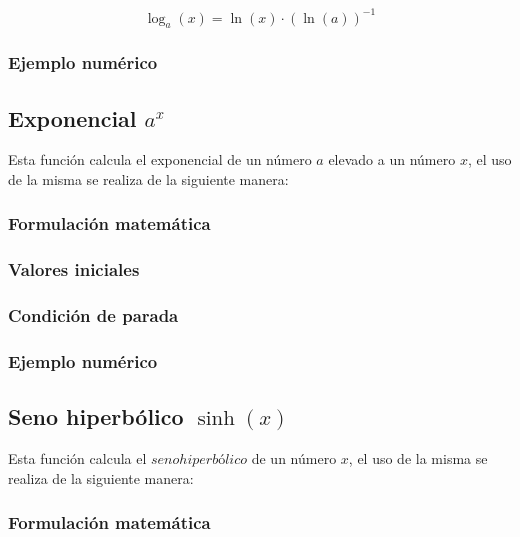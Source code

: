 \documentclass[10pt,a4paper]{article}
\begin{document}
	\begin{equation}\label{key13}
		\log_{a}(x) = \ln(x)\cdot (\ln(a))^{-1}
	\end{equation}
	
	\subsubsection{Ejemplo numérico}
	
	\subsection{Exponencial $a^{x}$}
	
	Esta función calcula el exponencial de un número $a$ elevado a un número $x$, el uso de la misma se realiza de la siguiente manera:
	
	\begin{center}
	\end{center}
	
	\subsubsection{Formulación matemática}
	
	\subsubsection{Valores iniciales}
	
	\subsubsection{Condición de parada}
	
	\subsubsection{Ejemplo numérico}
	
	\subsection{Seno hiperbólico $\sinh(x)$}
	
	Esta función calcula el $seno hiperbólico$ de un número $x$, el uso de la misma se realiza de la siguiente manera:
	
	\begin{center}
	\end{center}
	
	\subsubsection{Formulación matemática}
	
\end{document}
